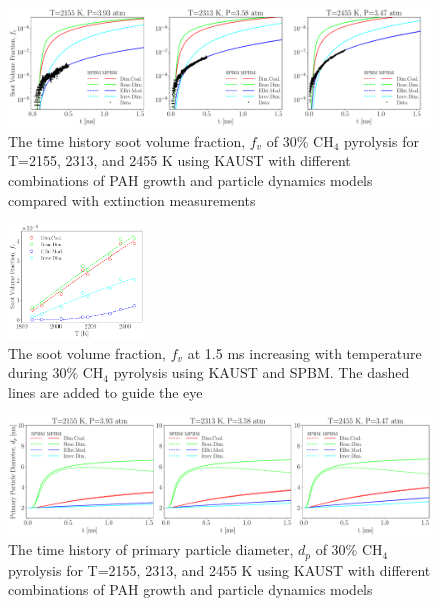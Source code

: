 
\begin{figure}[H]
	\centering
	\includegraphics[width=1\textwidth]{Figures/Results/Shocktube/Stanford/june/30CH4_sootvf_kaust_subset.pdf}
	\caption{The time history soot volume fraction, $f_v$ of 30\% $\mathrm{CH_4}$ pyrolysis for T=2155, 2313, and 2455 K using KAUST with different combinations of PAH growth and particle dynamics models compared with extinction measurements}
	\label{fig:shocktubest_30ch4_fv_kaust_subset} 
\end{figure}


\begin{figure}[H]
	\centering
	\includegraphics[width=0.32\textwidth]{Figures/Results/Shocktube/Stanford/june/30CH4_sootvf_kaust_1.5ms.pdf}
	\caption{The soot volume fraction, $f_v$ at 1.5 ms increasing with temperature during 30\% $\mathrm{CH_4}$ pyrolysis using KAUST and SPBM. The dashed lines are added to guide the eye}
	\label{fig:shocktubest_30ch4_fv_kaust_last} 
\end{figure}

\begin{figure}[H]
	\centering
	\includegraphics[width=1\textwidth]{Figures/Results/Shocktube/Stanford/june/30CH4_sootdp_kaust_subset.pdf}
	\caption{The time history of primary particle diameter, $d_p$ of 30\% $\mathrm{CH_4}$ pyrolysis for T=2155, 2313, and 2455 K using KAUST with different combinations of PAH growth and particle dynamics models}
	\label{fig:shocktubest_30ch4_dp_kaust_subset} 
\end{figure}

